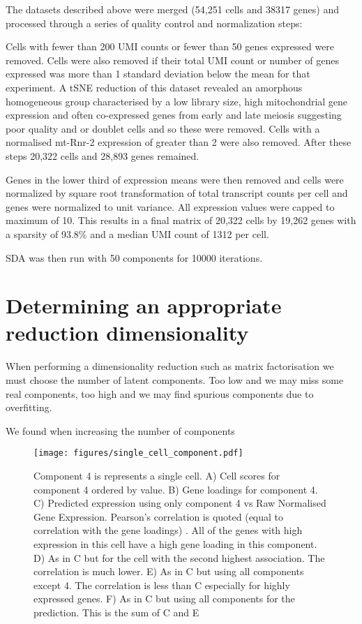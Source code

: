 The datasets described above were merged (54,251 cells and 38317 genes) and processed through a series of quality control and normalization steps:

Cells with fewer than 200 UMI counts or fewer than 50 genes expressed were removed. Cells were also removed if their total UMI count or number of genes expressed was more than 1 standard deviation below the mean for that experiment. A tSNE reduction of this dataset revealed an amorphous homogeneous group characterised by a low library size, high mitochondrial gene expression and often co-expressed genes from early and late meiosis suggesting poor quality and or doublet cells and so these were removed. Cells with a normalised mt-Rnr-2 expression of greater than 2 were also removed. After these steps 20,322 cells and 28,893 genes remained.

Genes in the lower third of expression means were then removed and cells were normalized by square root transformation of total transcript counts per cell and genes were normalized to unit variance. All expression values were capped to maximum of 10. This results in a final matrix of 20,322 cells by 19,262 genes with a sparsity of 93.8\% and a median UMI count of 1312 per cell.

SDA was then run with 50 components for 10000 iterations.

\section{Determining an appropriate reduction dimensionality}

When performing a dimensionality reduction such as matrix factorisation we must choose the number of latent components. Too low and we may miss some real components, too high and we may find spurious components due to overfitting.

We found when increasing the number of components 

\begin{figure}[H]
	\centering
	\texttt{[image: figures/single\_cell\_component.pdf]}
	\caption{Component 4 is represents a single cell. A) Cell scores for component 4 ordered by value. B) Gene loadings for component 4. C) Predicted expression using only component 4 vs Raw Normalised Gene Expression. Pearson's correlation is quoted (equal to correlation with the gene loadings) . All of the genes with high expression in this cell have a high gene loading in this component. D) As in C but for the cell with the second highest association. The correlation is much lower. E) As in C but using all components except 4. The correlation is less than C especially for highly expressed genes. F) As in C but using all components for the prediction.  This is the sum of C and E}
	\label{fig:single_cell_component}
\end{figure}

